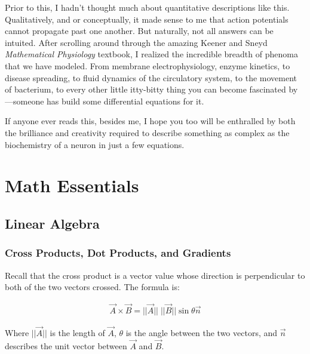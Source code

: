 \documentclass[12pt]{report}
\begin{document}
Prior to this, I hadn't thought much about quantitative descriptions like this. Qualitatively, and or conceptually, it made sense to me that action potentials cannot propagate past one another. But naturally, not all answers can be intuited. After scrolling around through the amazing Keener and Sneyd \textit{Mathematical Physiology} textbook, I realized the incredible breadth of phenoma that we have modeled. From membrane electrophysiology, enzyme kinetics, to disease spreading, to fluid dynamics of the circulatory system, to the movement of bacterium, to every other little itty-bitty thing you can become fascinated by---someone has build some differential equations for it.\newline

If anyone ever reads this, besides me, I hope you too will be enthralled by both the brilliance and creativity required to describe something as complex as the biochemistry of a neuron in just a few equations. 



\chapter{Math Essentials}

\section{Linear Algebra}

\label{sec:linalg}

\subsection{Cross Products, Dot Products, and Gradients}

Recall that the cross product is a vector value whose direction is perpendicular to both of the two vectors crossed. The formula is:

\begin{equation} \label{crossproductformula}
\begin{split}
\vec{A} \times \vec{B} = ||\vec{A}|| \; ||\vec{B}|| \sin\theta \vec{n}
\end{split}
\end{equation}

Where $||\vec{A}||$ is the length of $\vec{A}$, $\theta$ is the angle between the two vectors, and $\vec{n}$ describes the unit vector between $\vec{A}$ and $\vec{B}$.\newline
\end{document}
